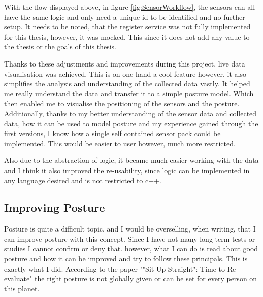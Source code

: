 With the flow displayed above, in figure \ref{fig:SensorWorkflow}, the sensors can all have the same logic and only need  a unique id to be identified and no further setup. It needs to be noted, that the register service was not fully implemented for this thesis, however, it was mocked. This since it does not add any value to the thesis or the goals of this thesis.

Thanks to these adjustments and improvements during this project, live data visualisation was achieved. This is on one hand a cool feature however, it also simplifies the analysis and understanding of the collected data vastly. It helped me really understand the data and transfer it to a simple posture model. Which then enabled me to visualise the positioning of the sensors and the posture. Additionally, thanks to my better understanding of the sensor data and collected data, how it can be used to model posture and my experience gained through the first versions, I know how a single self contained sensor pack could be implemented. This would be easier to user however, much more restricted. 

Also due to the abstraction of logic, it became much easier working with the data and I think it also improved the re-usability, since logic can be implemented in any language desired and is not restricted to c++.

\subsection{Improving Posture}

Posture is quite a difficult topic, and I would be overselling, when writing, that I can improve posture with this concept. Since I have not many long term tests or studies I cannot confirm or deny that. however, what I can do is read about good posture and how it can be improved and try to follow these principals. This is exactly what I did. According to the paper ""Sit Up Straight": Time to Re-evaluate" \cite{SitUpSt77:online} the right posture is not globally given or can be set for every person on this planet. 

